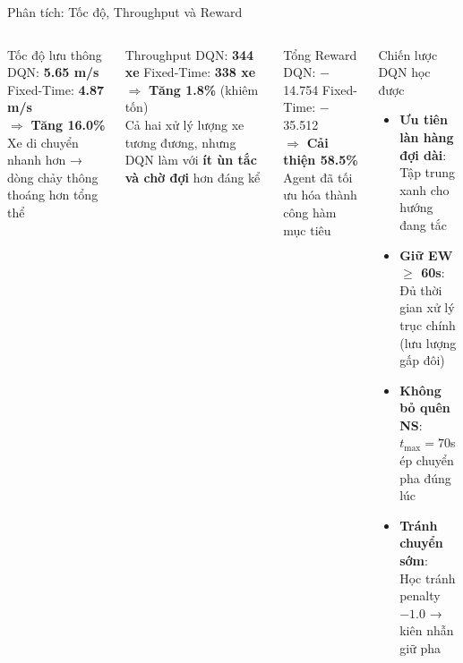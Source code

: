 \begin{frame}{Phân tích: Tốc độ, Throughput và Reward}
  \begin{columns}[T]
    \begin{block}{Tốc độ lưu thông}
      DQN: \textbf{5.65 m/s} \quad Fixed-Time: \textbf{4.87 m/s}\\
      $\Rightarrow$ \textcolor{techgreen}{\textbf{Tăng 16.0\%}}\\[4pt]
      Xe di chuyển nhanh hơn → dòng chảy thông thoáng hơn tổng thể
    \end{block}
    \vspace{6pt}
    \begin{block}{Throughput}
      DQN: \textbf{344 xe} \quad Fixed-Time: \textbf{338 xe}\\
      $\Rightarrow$ \textcolor{techgreen}{\textbf{Tăng 1.8\%}} \quad (khiêm tốn)\\[4pt]
      Cả hai xử lý lượng xe tương đương, nhưng DQN làm với \textbf{ít ùn tắc và chờ đợi} hơn đáng kể
    \end{block}
    \vspace{6pt}
    \begin{block}{Tổng Reward}
      DQN: $-$14.754 \quad Fixed-Time: $-$35.512\\
      $\Rightarrow$ \textcolor{techgreen}{\textbf{Cải thiện 58.5\%}}\\
      Agent đã tối ưu hóa thành công hàm mục tiêu
    \end{block}

    \begin{exampleblock}{Chiến lược DQN học được}
      \begin{itemize}
        \setlength{\itemsep}{5pt}
        \item \textbf{Ưu tiên làn hàng đợi dài}:\\
              Tập trung xanh cho hướng đang tắc
        \item \textbf{Giữ EW $\geq$ 60s}:\\
              Đủ thời gian xử lý trục chính (lưu lượng gấp đôi)
        \item \textbf{Không bỏ quên NS}:\\
              $t_{\max}=70$s ép chuyển pha đúng lúc
        \item \textbf{Tránh chuyển sớm}:\\
              Học tránh penalty $-1.0$ → kiên nhẫn giữ pha
      \end{itemize}
    \end{exampleblock}
  \end{columns}
\end{frame}

